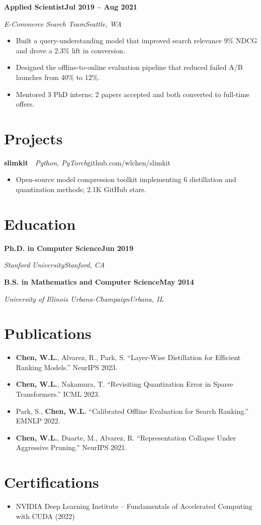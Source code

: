 \documentclass[letterpaper,10pt]{article}
\newcommand{\rRole}[4]{%
  \vspace{3pt}%
  \noindent\textbf{#1}\hfill\textbf{#4}\par
  \noindent\textit{\color{muted}#2}\hfill\textit{\color{muted}#3}\par
  \vspace{1pt}%
}
\newcommand{\rProject}[3]{%
  \vspace{3pt}%
  \noindent\textbf{#1}\ \textbar\ \textit{\color{muted}#2}\hfill#3\par
  \vspace{1pt}%
}
\newcommand{\rEdu}[4]{%
  \vspace{3pt}%
  \noindent\textbf{#1}\hfill\textbf{#4}\par
  \noindent\textit{\color{muted}#2}\hfill\textit{\color{muted}#3}\par
  \vspace{1pt}%
}
\newenvironment{rBullets}
  {\begin{itemize}[leftmargin=13pt,itemsep=1.5pt,parsep=0pt,topsep=2pt,
                   partopsep=0pt,label=\textbullet]}
  {\end{itemize}}
\begin{document}
\rRole{Applied Scientist}{E-Commerce Search Team}{Seattle, WA}{Jul 2019 -- Aug 2021}
\begin{rBullets}
  \item Built a query-understanding model that improved search relevance 9\% NDCG and drove a 2.3\% lift in conversion.
  \item Designed the offline-to-online evaluation pipeline that reduced failed A/B launches from 40\% to 12\%.
  \item Mentored 3 PhD interns; 2 papers accepted and both converted to full-time offers.
\end{rBullets}

\section{Projects}

\rProject{slimkit}{Python, PyTorch}{github.com/wlchen/slimkit}
\begin{rBullets}
  \item Open-source model compression toolkit implementing 6 distillation and quantization methods; 2.1K GitHub stars.
\end{rBullets}

\section{Education}
\rEdu{Ph.D. in Computer Science}{Stanford University}{Stanford, CA}{Jun 2019}
\rEdu{B.S. in Mathematics and Computer Science}{University of Illinois Urbana-Champaign}{Urbana, IL}{May 2014}

\section{Publications}
\begin{rBullets}
  \item \textbf{Chen, W.L.}, Alvarez, R., Park, S. ``Layer-Wise Distillation for Efficient Ranking Models.'' NeurIPS 2023.
  \item \textbf{Chen, W.L.}, Nakamura, T. ``Revisiting Quantization Error in Sparse Transformers.'' ICML 2023.
  \item Park, S., \textbf{Chen, W.L.} ``Calibrated Offline Evaluation for Search Ranking.'' EMNLP 2022.
  \item \textbf{Chen, W.L.}, Duarte, M., Alvarez, R. ``Representation Collapse Under Aggressive Pruning.'' NeurIPS 2021.
\end{rBullets}

\section{Certifications}
\begin{rBullets}
  \item NVIDIA Deep Learning Institute -- Fundamentals of Accelerated Computing with CUDA (2022)
\end{rBullets}
\end{document}
